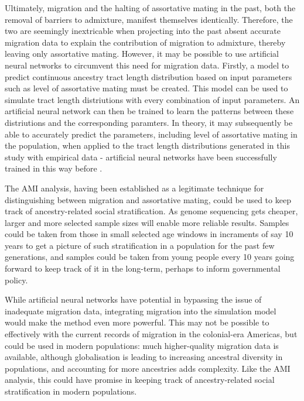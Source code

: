 \documentclass[11pt]{article}
\begin{document}
Ultimately, migration and the halting of assortative mating in the past, both the removal of barriers to admixture, manifest themselves identically. Therefore, the two are seemingly inextricable when projecting into the past absent accurate migration data to explain the contribution of migration to admixture, thereby leaving only assortative mating. However, it may be possible to use artificial neural networks to circumvent this need for migration data. Firstly, a model to predict continuous ancestry tract length distribution based on input parameters such as level of assortative mating must be created. This model can be used to simulate tract length distriutions with every combination of input parameters. An artificial neural network can then be trained to learn the patterns between these distriutions and the corresponding paramters. In theory, it may subsequently be able to accurately predict the parameters, including level of assortative mating in the population, when applied to the tract length distributions generated in this study with empirical data - artificial neural networks have been successfully trained in this way before \parencite{Sheehan2016}. 

The AMI analysis, having been established as a legitimate technique for distinguishing between migration and assortative mating, could be used to keep track of ancestry-related social stratification. As genome sequencing gets cheaper, larger and more selected sample sizes will enable more reliable results. Samples could be taken from those in small selected age windows in incraments of say 10 years to get a picture of such stratification in a population for the past few generations, and samples could be taken from young people every 10 years going forward to keep track of it in the long-term, perhaps to inform governmental policy.

While artificial neural networks have potential in bypassing the issue of inadequate migration data, integrating migration into the simulation model would make the method even more powerful. This may not be possible to effectively with the current records of migration in the colonial-era Americas, but could be used in modern populations: much higher-quality migration data is available, although globalisation is leading to increasing ancestral diversity in populations, and accounting for more ancestries adds complexity. Like the AMI analysis, this could have promise in keeping track of ancestry-related social stratification in modern populations.
\end{document}
